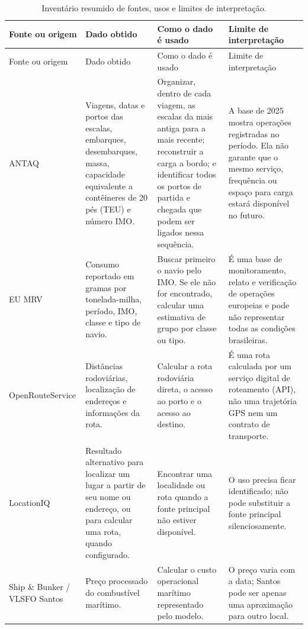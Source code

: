\begingroup
\footnotesize
\setlength{\LTleft}{0pt}
\setlength{\LTright}{0pt}
\setlength{\tabcolsep}{4pt}
\renewcommand{\arraystretch}{1.15}
\begin{longtable}{L{0.20\textwidth}L{0.25\textwidth}L{0.25\textwidth}L{0.22\textwidth}}
\caption{Inventário resumido de fontes, usos e limites de interpretação.}
\label{tab:app-fontes-proveniencia}\\
\toprule
Fonte ou origem & Dado obtido & Como o dado é usado & Limite de interpretação \\
\midrule
\endfirsthead
\toprule
Fonte ou origem & Dado obtido & Como o dado é usado & Limite de interpretação \\
\midrule
\endhead
ANTAQ & Viagens, datas e portos das escalas, embarques, desembarques, massa, capacidade equivalente a contêineres de 20 pés (TEU) e número IMO. & Organizar, dentro de cada viagem, as escalas da mais antiga para a mais recente; reconstruir a carga a bordo; e identificar todos os portos de partida e chegada que podem ser ligados nessa sequência. & A base de 2025 mostra operações registradas no período. Ela não garante que o mesmo serviço, frequência ou espaço para carga estará disponível no futuro.\\
EU MRV & Consumo reportado em gramas por tonelada-milha, período, IMO, classe e tipo de navio. & Buscar primeiro o navio pelo IMO. Se ele não for encontrado, calcular uma estimativa de grupo por classe ou tipo. & É uma base de monitoramento, relato e verificação de operações europeias e pode não representar todas as condições brasileiras.\\
OpenRouteService & Distâncias rodoviárias, localização de endereços e informações da rota. & Calcular a rota rodoviária direta, o acesso ao porto e o acesso ao destino. & É uma rota calculada por um serviço digital de roteamento (API), não uma trajetória GPS nem um contrato de transporte.\\
LocationIQ & Resultado alternativo para localizar um lugar a partir de seu nome ou endereço, ou para calcular uma rota, quando configurado. & Encontrar uma localidade ou rota quando a fonte principal não estiver disponível. & O uso precisa ficar identificado; não pode substituir a fonte principal silenciosamente.\\
Ship \& Bunker / VLSFO Santos & Preço processado do combustível marítimo. & Calcular o custo operacional marítimo representado pelo modelo. & O preço varia com a data; Santos pode ser apenas uma aproximação para outro local.\\

\end{longtable}
